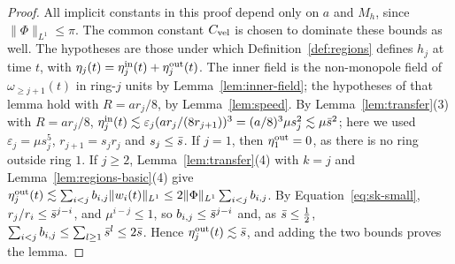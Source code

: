 \begin{proof}
All implicit constants in this proof depend only on $a$ and $M_h$, since
$\|\Phi\|_{L^1}\le\pi$. The common constant $C_{\mathrm{vel}}$ is chosen to dominate
these bounds as well. The hypotheses are those under which
Definition~\ref{def:regions} defines $h_j$ at time $t$, with
$\eta_j(t)=\eta^{\mathrm{in}}_j(t)+\eta^{\mathrm{out}}_j(t)$. The inner field is the non-monopole field of
$\omega_{\ge j+1}(t)$ in ring-$j$ units by
Lemma~\ref{lem:inner-field}; the hypotheses of that lemma hold with $R=ar_j/8$, by
Lemma~\ref{lem:speed}. By
Lemma~\ref{lem:transfer}(3) with $R=ar_j/8$,
$\eta^{\mathrm{in}}_j(t)\lesssim\varepsilon_j(ar_j/(8r_{j+1}))^3=(a/8)^3\mu s_j^2\lesssim\mu\bar s^2$;
here we used $\varepsilon_j=\mu s_j^5$, $r_{j+1}=s_jr_j$ and $s_j\le\bar s$.
If $j=1$, then $\eta^{\mathrm{out}}_1=0$, as there is no ring outside ring $1$. If $j\ge2$, Lemma~\ref{lem:transfer}(4) with $k=j$ and
Lemma~\ref{lem:regions-basic}(4) give
$\eta^{\mathrm{out}}_j(t)\lesssim\sum_{i<j}b_{i,j}\|w_i(t)\|_{L^1}\le2\|\Phi\|_{L^1}\sum_{i<j}b_{i,j}$.
By Equation~\eqref{eq:sk-small}, $r_j/r_i\le\bar s^{j-i}$, and $\mu^{i-j}\le1$, so
$b_{i,j}\le\bar s^{j-i}$ and, as $\bar s\le\frac12$,
$\sum_{i<j}b_{i,j}\le\sum_{l\ge1}\bar s^l\le2\bar s$. Hence
$\eta^{\mathrm{out}}_j(t)\lesssim\bar s$, and adding the two bounds proves
the lemma.
\end{proof}
